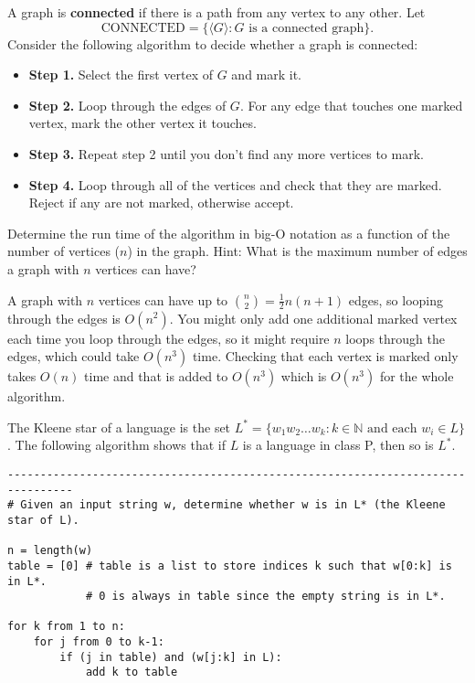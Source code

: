\documentclass[12pt]{exam}
\newcommand{\N}{\mathbb{N}}
\begin{document}
\begin{questions}
\question A graph is \textbf{connected} if there is a path from any vertex to any other. Let
$$\text{CONNECTED} = \{ \langle G \rangle : G \text{ is a connected graph}\}.$$
Consider the following algorithm to decide whether a graph is connected:
\begin{itemize}
\item \textbf{Step 1.} Select the first vertex of $G$ and mark it.
\item \textbf{Step 2.} Loop through the edges of $G$.  For any edge that touches one marked vertex, mark the other vertex it touches. 
\item \textbf{Step 3.} Repeat step 2 until you don't find any more vertices to mark. 
\item \textbf{Step 4.} Loop through all of the vertices and check that they are marked.  Reject if any are not marked, otherwise accept. 
\end{itemize}
Determine the run time of the algorithm in big-O notation as a function of the number of vertices ($n$) in the graph. Hint: What is the maximum number of edges a graph with $n$ vertices can have?  
\begin{solution}
A graph with $n$ vertices can have up to $\binom{n}{2} = \tfrac{1}{2}n(n+1)$ edges, so looping through the edges is $O(n^2)$. You might only add one additional marked vertex each time you loop through the edges, so it might require $n$ loops through the edges, which could take $O(n^3)$ time.  Checking that each vertex is marked only takes $O(n)$ time and that is added to $O(n^3)$ which is $O(n^3)$ for the whole algorithm. 
\end{solution}
\vfill

\newpage
\question The Kleene star of a language is the set $L^* = \{w_1 w_2 \ldots w_k : k \in \N \text{ and each } w_i \in L \}$. The following algorithm shows that if $L$ is a language in class P, then so is $L^*$.

\begin{verbatim}
--------------------------------------------------------------------------------
# Given an input string w, determine whether w is in L* (the Kleene star of L). 

n = length(w)
table = [0] # table is a list to store indices k such that w[0:k] is in L*. 
            # 0 is always in table since the empty string is in L*.

for k from 1 to n:
    for j from 0 to k-1:
        if (j in table) and (w[j:k] in L):
            add k to table


\end{verbatim}
\end{questions}
\end{document}
